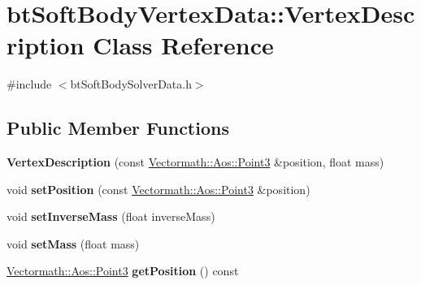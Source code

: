 \hypertarget{classbtSoftBodyVertexData_1_1VertexDescription}{}\section{bt\+Soft\+Body\+Vertex\+Data\+:\+:Vertex\+Description Class Reference}
\label{classbtSoftBodyVertexData_1_1VertexDescription}


{\ttfamily \#include $<$bt\+Soft\+Body\+Solver\+Data.\+h$>$}

\subsection*{Public Member Functions}
\begin{DoxyCompactItemize}
\item 
\mbox{\label{classbtSoftBodyVertexData_1_1VertexDescription_aedff609f8656322a5b0dbe7019cce12b}} 
{\bfseries Vertex\+Description} (const \hyperlink{classVectormath_1_1Aos_1_1Point3}{Vectormath\+::\+Aos\+::\+Point3} \&position, float mass)
\item 
\mbox{\label{classbtSoftBodyVertexData_1_1VertexDescription_a56f64e174dcd0a4118a776affabedf4a}} 
void {\bfseries set\+Position} (const \hyperlink{classVectormath_1_1Aos_1_1Point3}{Vectormath\+::\+Aos\+::\+Point3} \&position)
\item 
\mbox{\label{classbtSoftBodyVertexData_1_1VertexDescription_af1dd19f6c64c78883f8558c57acfdfca}} 
void {\bfseries set\+Inverse\+Mass} (float inverse\+Mass)
\item 
\mbox{\label{classbtSoftBodyVertexData_1_1VertexDescription_ace4e313f42951933eb855027f965e122}} 
void {\bfseries set\+Mass} (float mass)
\item 
\mbox{\label{classbtSoftBodyVertexData_1_1VertexDescription_a5e2189e93988d5285e6c51ba8626f073}} 
\hyperlink{classVectormath_1_1Aos_1_1Point3}{Vectormath\+::\+Aos\+::\+Point3} {\bfseries get\+Position} () const
\item 

\end{DoxyCompactItemize}
